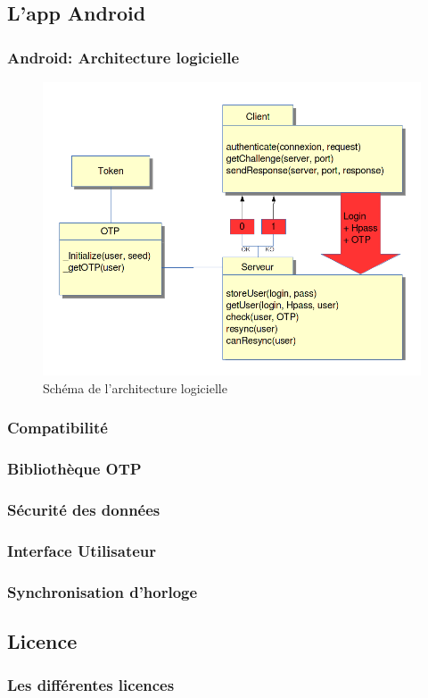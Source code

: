 \documentclass[xcolor=table]{beamer}
\begin{document}
\subsection{L'app Android}
\begin{frame}
\frametitle{Android: Architecture logicielle}
\begin{figure}
 \includegraphics[scale=0.3]{../graphics/architecture.png} 
 \caption{Schéma de l'architecture logicielle}
\end{figure}

\end{frame}

\begin{frame}
\frametitle{Compatibilité}

\end{frame}
\begin{frame}
\frametitle{Bibliothèque OTP}
\end{frame}

\begin{frame}
\frametitle{Sécurité des données}

\end{frame}

\begin{frame}
\frametitle{Interface Utilisateur}
\end{frame}

\begin{frame}
\frametitle{Synchronisation d'horloge}
\end{frame}

\subsection{Licence}
\begin{frame}
\frametitle{Les différentes licences}

\end{frame}
\end{document}
